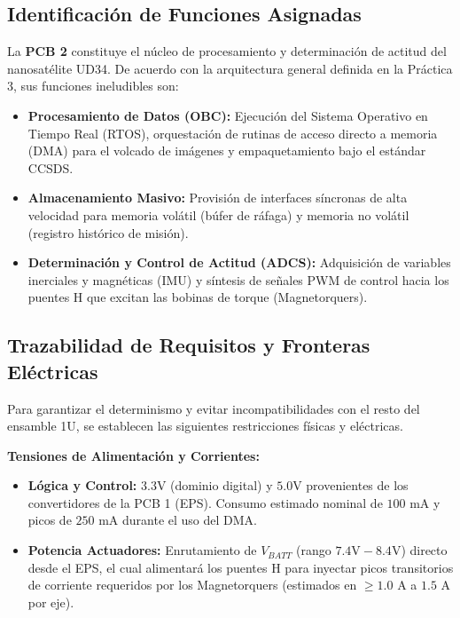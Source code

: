 \documentclass[11pt,a4paper]{article}
\begin{document}
\subsection{Identificación de Funciones Asignadas}
La \textbf{PCB 2} constituye el núcleo de procesamiento y determinación de actitud del nanosatélite UD34. De acuerdo con la arquitectura general definida en la Práctica 3, sus funciones ineludibles son:
\begin{itemize}
    \item \textbf{Procesamiento de Datos (OBC):} Ejecución del Sistema Operativo en Tiempo Real (RTOS), orquestación de rutinas de acceso directo a memoria (DMA) para el volcado de imágenes y empaquetamiento bajo el estándar CCSDS.
    \item \textbf{Almacenamiento Masivo:} Provisión de interfaces síncronas de alta velocidad para memoria volátil (búfer de ráfaga) y memoria no volátil (registro histórico de misión).
    \item \textbf{Determinación y Control de Actitud (ADCS):} Adquisición de variables inerciales y magnéticas (IMU) y síntesis de señales PWM de control hacia los puentes H que excitan las bobinas de torque (Magnetorquers).
\end{itemize}

\subsection{Trazabilidad de Requisitos y Fronteras Eléctricas}
Para garantizar el determinismo y evitar incompatibilidades con el resto del ensamble 1U, se establecen las siguientes restricciones físicas y eléctricas.

\textbf{Tensiones de Alimentación y Corrientes:}
\begin{itemize}
    \item \textbf{Lógica y Control:} $3.3\text{V}$ (dominio digital) y $5.0\text{V}$ provenientes de los convertidores de la PCB 1 (EPS). Consumo estimado nominal de $100\text{ mA}$ y picos de $250\text{ mA}$ durante el uso del DMA.
    \item \textbf{Potencia Actuadores:} Enrutamiento de $V_{BATT}$ (rango $7.4\text{V} - 8.4\text{V}$) directo desde el EPS, el cual alimentará los puentes H para inyectar picos transitorios de corriente requeridos por los Magnetorquers (estimados en $\ge 1.0\text{ A}$ a $1.5\text{ A}$ por eje).
\end{itemize}
\end{document}
